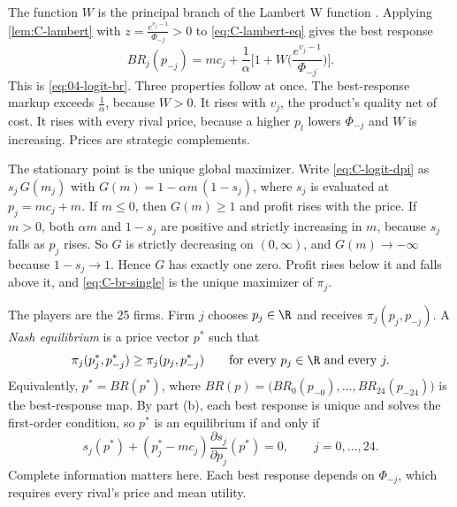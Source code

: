 The function $W$ is the principal branch of the Lambert W function \citep{CorlessEtAl1996}. Applying
\cref{lem:C-lambert} with $z = \frac{e^{v_j - 1}}{\Phi_{-j}} > 0$ to \eqref{eq:C-lambert-eq} gives the best response
\begin{equation}\label{eq:C-br-single}
  BR_j(p_{-j}) = mc_j + \frac{1}{\alpha}\Big[1 + W\Big(\frac{e^{v_j - 1}}{\Phi_{-j}}\Big)\Big] .
\end{equation}
This is \eqref{eq:04-logit-br}. Three properties follow at once. The best-response markup exceeds $\frac{1}{\alpha}$,
because $W > 0$. It rises with $v_j$, the product's quality net of cost. It rises with every rival price, because a
higher $p_l$ lowers $\Phi_{-j}$ and $W$ is increasing. Prices are strategic complements.

The stationary point is the unique global maximizer. Write \eqref{eq:C-logit-dpi} as $s_j\,G(m_j)$ with
$G(m) = 1 - \alpha m\,(1 - s_j)$, where $s_j$ is evaluated at $p_j = mc_j + m$. If $m \le 0$, then $G(m) \ge 1$ and
profit rises with the price. If $m > 0$, both $\alpha m$ and $1 - s_j$ are positive and strictly increasing in $m$,
because $s_j$ falls as $p_j$ rises. So $G$ is strictly decreasing on $(0, \infty)$, and $G(m) \to -\infty$ because
$1 - s_j \to 1$. Hence $G$ has exactly one zero. Profit rises below it and falls above it, and
\eqref{eq:C-br-single} is the unique maximizer of $\pi_j$.

The players are the 25 firms. Firm $j$ chooses $p_j \in \R$ and receives $\pi_j(p_j, p_{-j})$. A \emph{Nash
equilibrium} is a price vector $p^*$ such that
\begin{equation*}
  \pi_j(p_j^*, p_{-j}^*) \ge \pi_j(p_j, p_{-j}^*) \qquad \text{for every } p_j \in \R \text{ and every } j .
\end{equation*}
Equivalently, $p^* = BR(p^*)$, where $BR(p) = \big(BR_0(p_{-0}), \dots, BR_{24}(p_{-24})\big)$ is the best-response
map. By part (b), each best response is unique and solves the first-order condition, so $p^*$ is an equilibrium if
and only if
\begin{equation}\label{eq:C-foc-single}
  s_j(p^*) + (p_j^* - mc_j)\frac{\partial s_j}{\partial p_j}(p^*) = 0 , \qquad j = 0, \dots, 24 .
\end{equation}
Complete information matters here. Each best response depends on $\Phi_{-j}$, which requires every rival's price
and mean utility.

